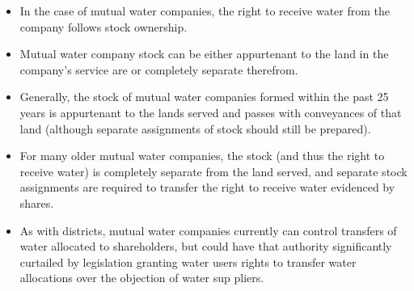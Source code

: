 \documentclass{article}
\begin{document}
\begin{enumerate}
\begin{itemize}
\begin{enumerate}
\begin{itemize}
\item In the case of mutual water companies, the right to receive water from the company follows stock ownership. 
\item Mutual water company stock can be either appurtenant to the land in the company's service are or completely separate therefrom. 
\item Generally, the stock of mutual water companies formed within the past 25 years is appurtenant to the lands served and passes with conveyances of that land (although separate assignments of stock should still be prepared). 
\item For many older mutual water companies, the stock (and thus the right to receive water) is completely separate from the land served, and separate stock assignments are required to transfer the right to receive water evidenced by shares. 
\item As with districts, mutual water companies currently can control transfers of water allocated to shareholders, but could have that authority significantly curtailed by legislation granting water users rights to transfer water allocations over the objection of water sup pliers.
\end{itemize}
\end{enumerate}
\end{itemize}
\end{enumerate}
\end{document}
